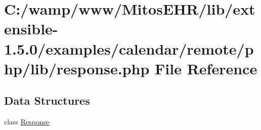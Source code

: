\hypertarget{response_8php}{\section{\-C\-:/wamp/www/\-Mitos\-E\-H\-R/lib/extensible-\/1.5.0/examples/calendar/remote/php/lib/response.php \-File \-Reference}
\label{response_8php}
}
\subsection*{\-Data \-Structures}
\begin{DoxyCompactItemize}
\item 
class \hyperlink{class_response}{\-Response}
\end{DoxyCompactItemize}
